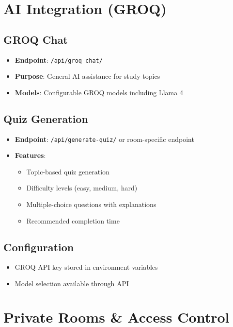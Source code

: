 \documentclass[11pt]{article}
\begin{document}
\section{AI Integration (GROQ)}

\subsection{GROQ Chat}
\begin{itemize}
  \item \textbf{Endpoint}: \texttt{/api/groq-chat/}
  \item \textbf{Purpose}: General AI assistance for study topics
  \item \textbf{Models}: Configurable GROQ models including Llama 4
\end{itemize}

\subsection{Quiz Generation}
\begin{itemize}
  \item \textbf{Endpoint}: \texttt{/api/generate-quiz/} or room-specific endpoint
  \item \textbf{Features}:
  \begin{itemize}
    \item Topic-based quiz generation
    \item Difficulty levels (easy, medium, hard)
    \item Multiple-choice questions with explanations
    \item Recommended completion time
  \end{itemize}
\end{itemize}

\subsection{Configuration}
\begin{itemize}
  \item GROQ API key stored in environment variables
  \item Model selection available through API
\end{itemize}

\section{Private Rooms \& Access Control}
\end{document}
